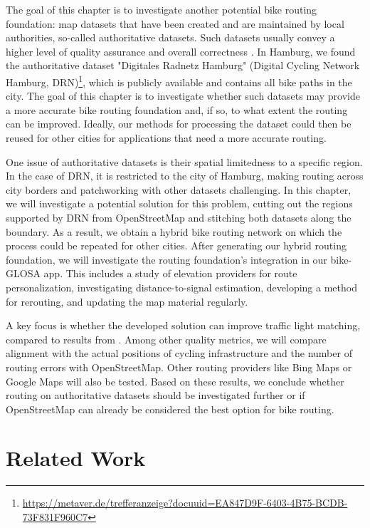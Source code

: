 The goal of this chapter is to investigate another potential bike routing foundation: map datasets that have been created and are maintained by local authorities, so-called authoritative datasets. Such datasets usually convey a higher level of quality assurance and overall correctness \cite{brovelli_towards_2017}. In Hamburg, we found the authoritative dataset "Digitales Radnetz Hamburg" (Digital Cycling Network Hamburg, DRN)\footnote{\url{https://metaver.de/trefferanzeige?docuuid=EA847D9F-6403-4B75-BCDB-73F831F960C7}}, which is publicly available and contains all bike paths in the city. The goal of this chapter is to investigate whether such datasets may provide a more accurate bike routing foundation and, if so, to what extent the routing can be improved. Ideally, our methods for processing the dataset could then be reused for other cities for applications that need a more accurate routing.

One issue of authoritative datasets is their spatial limitedness to a specific region. In the case of DRN, it is restricted to the city of Hamburg, making routing across city borders and patchworking with other datasets challenging. In this chapter, we will investigate a potential solution for this problem, cutting out the regions supported by DRN from OpenStreetMap and stitching both datasets along the boundary. As a result, we obtain a hybrid bike routing network on which the process could be repeated for other cities. After generating our hybrid routing foundation, we will investigate the routing foundation's integration in our bike-GLOSA app. This includes a study of elevation providers for route personalization, investigating distance-to-signal estimation, developing a method for rerouting, and updating the map material regularly.

A key focus is whether the developed solution can improve traffic light matching, compared to results from . Among other quality metrics, we will compare alignment with the actual positions of cycling infrastructure and the number of routing errors with OpenStreetMap. Other routing providers like Bing Maps or Google Maps will also be tested. Based on these results, we conclude whether routing on authoritative datasets should be investigated further or if OpenStreetMap can already be considered the best option for bike routing.

\section{Related Work}

